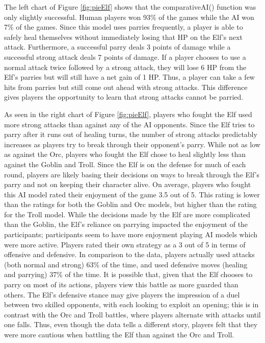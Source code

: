 The left chart of Figure \ref{fig:pieElf} shows that the comparativeAI() function was only slightly successful. Human players won 93\% of the games while the AI won 7\% of the games. Since this model uses parries frequently, a player is able to safely heal themselves without immediately losing that HP on the Elf's next attack. Furthermore, a successful parry deals 3 points of damage while a successful strong attack deals 7 points of damage. If a player chooses to use a normal attack twice followed by a strong attack, they will lose 6 HP from the Elf's parries but will still have a net gain of 1 HP. Thus, a player can take a few hits from parries but still come out ahead with strong attacks. This difference gives players the opportunity to learn that strong attacks cannot be parried.

As seen in the right chart of Figure \ref{fig:pieElf}, players who fought the Elf used more strong attacks than against any of the AI opponents. Since the Elf tries to parry after it runs out of healing turns, the number of strong attacks predictably increases as players try to break through their opponent's parry. While not as low as against the Orc, players who fought the Elf chose to heal slightly less than against the Goblin and Troll. Since the Elf is on the defense for much of each round, players are likely basing their decisions on ways to break through the Elf's parry and not on keeping their character alive. On average, players who fought this AI model rated their enjoyment of the game 3.5 out of 5. This rating is lower than the ratings for both the Goblin and Orc models, but higher than the rating for the Troll model. While the decisions made by the Elf are more complicated than the Goblin, the Elf's reliance on parrying impacted the enjoyment of the participants; participants seem to have more enjoyment playing AI models which were more active. Players rated their own strategy as a 3 out of 5 in terms of offensive and defensive. In comparison to the data, players actually used attacks (both normal and strong) 63\% of the time, and used defensive moves (healing and parrying) 37\% of the time. It is possible that, given that the Elf chooses to parry on most of its actions, players view this battle as more guarded than others. The Elf's defensive stance may give players the impression of a duel between two skilled opponents, with each looking to exploit an opening; this is in contrast with the Orc and Troll battles, where players alternate with attacks until one falls. Thus, even though the data tells a different story, players felt that they were more cautious when battling the Elf than against the Orc and Troll.

